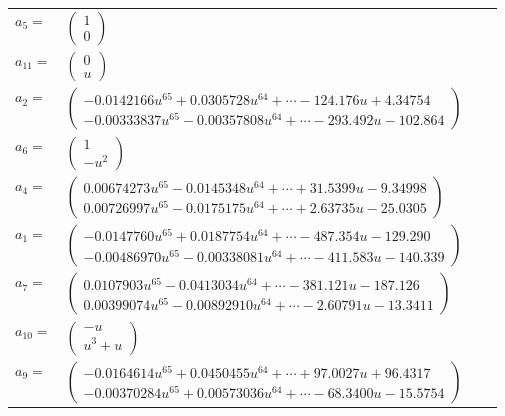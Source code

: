 \documentclass[1p]{elsarticle_modified}
\theoremstyle{definition}
\begin{document}
\begin{tabular}{m{7pt} m{180pt} m{7pt} m{180pt} }
\flushright $a_{5}=$&$\begin{pmatrix}1\\0\end{pmatrix}$ \\
\flushright $a_{11}=$&$\begin{pmatrix}0\\u\end{pmatrix}$ \\
\flushright $a_{2}=$&$\begin{pmatrix}-0.0142166 u^{65}+0.0305728 u^{64}+\cdots-124.176 u+4.34754\\-0.00333837 u^{65}-0.00357808 u^{64}+\cdots-293.492 u-102.864\end{pmatrix}$ \\
\flushright $a_{6}=$&$\begin{pmatrix}1\\- u^2\end{pmatrix}$ \\
\flushright $a_{4}=$&$\begin{pmatrix}0.00674273 u^{65}-0.0145348 u^{64}+\cdots+31.5399 u-9.34998\\0.00726997 u^{65}-0.0175175 u^{64}+\cdots+2.63735 u-25.0305\end{pmatrix}$ \\
\flushright $a_{1}=$&$\begin{pmatrix}-0.0147760 u^{65}+0.0187754 u^{64}+\cdots-487.354 u-129.290\\-0.00486970 u^{65}-0.00338081 u^{64}+\cdots-411.583 u-140.339\end{pmatrix}$ \\
\flushright $a_{7}=$&$\begin{pmatrix}0.0107903 u^{65}-0.0413034 u^{64}+\cdots-381.121 u-187.126\\0.00399074 u^{65}-0.00892910 u^{64}+\cdots-2.60791 u-13.3411\end{pmatrix}$ \\
\flushright $a_{10}=$&$\begin{pmatrix}- u\\u^3+u\end{pmatrix}$ \\
\flushright $a_{9}=$&$\begin{pmatrix}-0.0164614 u^{65}+0.0450455 u^{64}+\cdots+97.0027 u+96.4317\\-0.00370284 u^{65}+0.00573036 u^{64}+\cdots-68.3400 u-15.5754\end{pmatrix}$ \\

\end{tabular}
\end{document}
